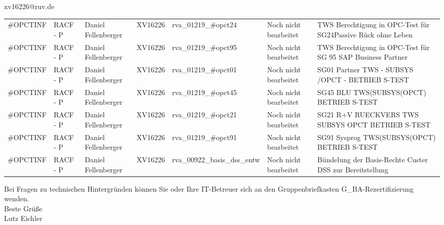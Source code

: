\documentclass[a4paper,landscape,12pt]{letter}
\begin{document}
\begin{letter}{xv16226@ruv.de\hfill \break}
\begin{tiny}
\begin{longtable}{|p{35mm}|p{15mm}|p{25mm}|p{10mm}|p{40mm}|p{50mm}|p{50mm}|}
\#OPCTINF & RACF - P & Daniel Fellenberger & XV16226 & rva\_01219\_\#opct24 & Noch nicht bearbeitet & TWS Berechtigung in OPC-Test für SG24Passive Rück ohne Leben \\
\#OPCTINF & RACF - P & Daniel Fellenberger & XV16226 & rva\_01219\_\#opct95 & Noch nicht bearbeitet &  TWS Berechtigung in OPC-Test für SG 95 SAP Business Partner \\
\#OPCTINF & RACF - P & Daniel Fellenberger & XV16226 & rva\_01219\_\#opct01 & Noch nicht bearbeitet & SG01 Partner TWS - SUBSYS /OPCT - BETRIEB S-TEST \\
\#OPCTINF & RACF - P & Daniel Fellenberger & XV16226 & rva\_01219\_\#opct45 & Noch nicht bearbeitet & SG45 BLU TWS(SUBSYS(OPCT) BETRIEB S-TEST \\
\#OPCTINF & RACF - P & Daniel Fellenberger & XV16226 & rva\_01219\_\#opct21 & Noch nicht bearbeitet & SG21 R+V RUECKVERS TWS SUBSYS OPCT BETRIEB S-TEST \\
\#OPCTINF & RACF - P & Daniel Fellenberger & XV16226 & rva\_01219\_\#opct91 & Noch nicht bearbeitet & SG91 Sysprog TWS(SUBSYS(OPCT) BETRIEB S-TEST \\
\#OPCTINF & RACF - P & Daniel Fellenberger & XV16226 & rva\_00922\_basis\_dss\_entw & Noch nicht bearbeitet & Bündelung der Basis-Rechte Custer DSS zur Bereitstellung \\

\hline
		\end{longtable}
		\end{tiny}
	
\begin{minipage}{\textwidth}
			Bei Fragen zu technischen Hintergründen können Sie 
			oder Ihre IT-Betreuer sich an den Gruppenbriefkasten 
			G\_BA-Rezertifizierung
			wenden.\\
			\linebreak
			Beste Grüße\\
			Lutz Eichler
	\end{minipage}
	\end{letter}
	
\end{document}
